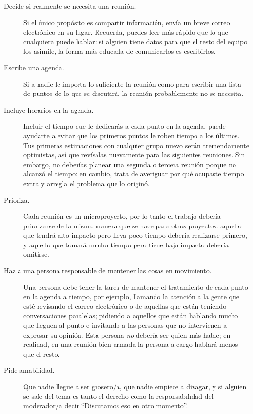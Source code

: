 \begin{description}

\item[Decide si realmente se necesita una reunión.]
  Si el único propósito es compartir información,
  envía un breve correo electrónico en su lugar.
  Recuerda,
  puedes leer más rápido que lo que cualquiera puede hablar:
  si alguien tiene datos para que el resto del equipo los asimile,
  la forma más educada de comunicarlos es escribirlos.

\item[Escribe una agenda.]
  Si a nadie le importa lo suficiente la reunión como para escribir una lista de puntos
  de lo que se discutirá,
  la reunión probablemente no se necesita.

\item[Incluye horarios en la agenda.]
  Incluir el tiempo que le dedicarás a cada punto en la agenda,
  puede ayudarte a evitar que los primeros puntos le roben tiempo a los últimos.
  Tus primeras estimaciones con cualquier grupo nuevo serán tremendamente optimistas,
  así que revísalas nuevamente para las siguientes reuniones.
  Sin embargo,
  no deberías planear una segunda o tercera reunión
  porque no alcanzó el tiempo:
  en cambio,
  trata de averiguar por qué ocupaste tiempo extra y arregla el problema que lo originó. 

\item[Prioriza.]
  Cada reunión es un microproyecto,
  por lo tanto el trabajo debería priorizarse de la misma manera que se hace para otros proyectos:
  aquello que tendrá alto impacto pero lleva poco tiempo debería realizarse primero,
  y aquello que tomará mucho tiempo pero tiene bajo impacto debería omitirse.

\item[Haz a una persona responsable de mantener las cosas en movimiento.]
  Una persona debe tener la tarea de mantener el tratamiento 
  de cada punto en la agenda a tiempo, por ejemplo,
  llamando la atención a la gente que esté revisando el correo electrónico 
  o de aquellas que están teniendo conversaciones paralelas;
  pidiendo a aquellos que están hablando mucho que lleguen al punto
  e invitando a las personas que no intervienen a expresar su opinión.
  Esta persona \emph{no} debería ser quien más hable;
  en realidad, 
  en una reunión bien armada la persona a cargo hablará menos 
  que el resto.

\item[Pide amabilidad.]
  Que nadie llegue a ser grosero/a,
  que nadie empiece a divagar,
  y si alguien se sale del tema
  es tanto el derecho como la responsabilidad del moderador/a decir
  ``Discutamos eso en otro momento''.


\end{description}
